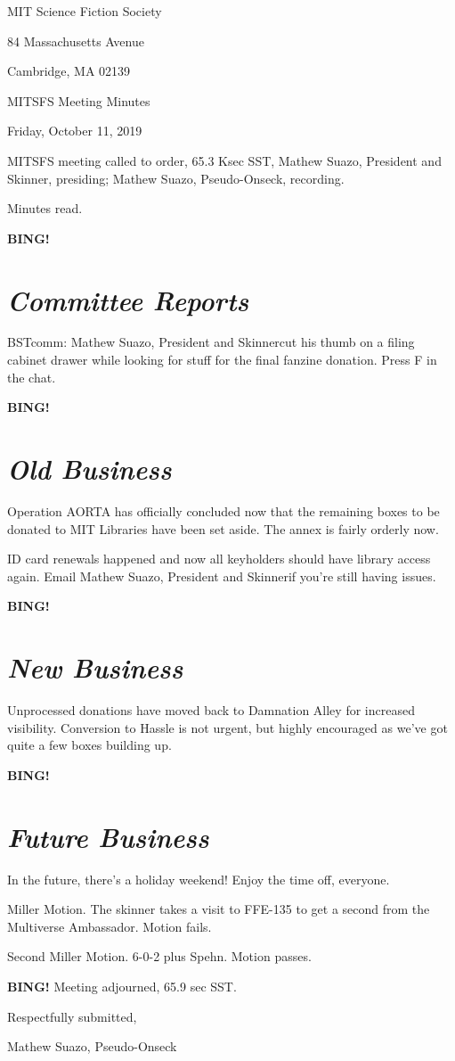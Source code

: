 \documentclass[10pt]{article}
\newcommand{\bing}{{\bf BING!} }
\newcommand{\goto}[1]{\bing \vskip 12pt \section*{{\em{#1}}}}
\newcommand{\ps}{ plus Spehn\xspace}
\newcommand{\skinner}{Mathew Suazo, President and Skinner}
\newcommand{\onseck}{Mathew Suazo, Pseudo-Onseck}
\newcommand{\meetingdate}{Friday, October 11, 2019 }
\begin{document}
\begin{center}

MIT Science Fiction Society

84 Massachusetts Avenue

Cambridge, MA 02139

\vspace{12pt}

MITSFS Meeting Minutes

\meetingdate

\end{center}

\vspace{18pt}

\setlength{\parskip}{6pt}

\noindent
MITSFS meeting called to order, 65.3 Ksec SST,
\skinner, presiding; \onseck, recording.

Minutes read.

\goto{Committee Reports}

BSTcomm: \skinner  cut his thumb on a filing cabinet drawer while looking for stuff for the final fanzine donation. Press F in the chat.

\goto{Old Business}

Operation AORTA has officially concluded now that the remaining boxes to be donated to MIT Libraries have been set aside. The annex is fairly orderly now.

ID card renewals happened and now all keyholders should have library access again. Email \skinner  if you're still having issues.

\goto{New Business}

Unprocessed donations have moved back to Damnation Alley for increased visibility. Conversion to Hassle is not urgent, but highly encouraged as we've got quite a few boxes building up.

\goto{Future Business}

In the future, there's a holiday weekend! Enjoy the time off, everyone.

Miller Motion. The skinner takes a visit to FFE-135 to get a second from the Multiverse Ambassador. Motion fails.

Second Miller Motion. 6-0-2 \ps. Motion passes.

\bing
\noindent
Meeting adjourned, 65.9 sec SST.

\vspace{18pt}

\centerline{Respectfully submitted,}
\centerline{\onseck}
\end{document}
